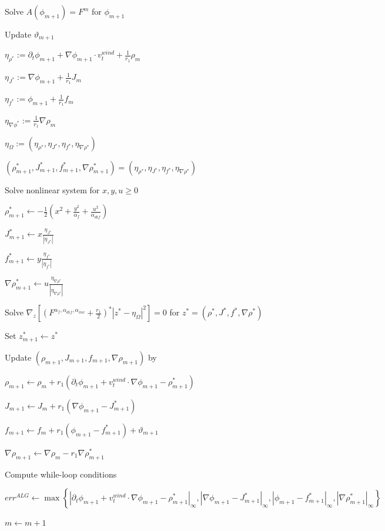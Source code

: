\begin{algorithm}
	\caption{Augmented Lagrangian Method with diffusion term}
	\begin{algorithmic}

		Solve $A(\phi_{m+1}) = F^m$ for $\phi_{m+1}$

		Update $\vartheta_{m+1}$

		$\eta_{\rho^*} := \partial_t\phi_{m+1} + \nabla\phi_{m+1} \cdot v_t^{wind} + \frac{1}{r_1}\rho_m$

		$\eta_{J^*} := \nabla\phi_{m+1} + \frac{1}{r_1}J_m$

		$\eta_{f^*} := \phi_{m+1} + \frac{1}{r_1}f_m$

		$\eta_{\nabla\phi^*} := \frac{1}{r_1}\nabla\rho_m$

		$\eta_\Omega := (\eta_{\rho^*},\eta_{J^*},\eta_{f^*},\eta_{\nabla\rho^*})$

			
		$(\rho_{m+1}^*,J_{m+1}^*,f_{m+1}^*,\nabla\rho_{m+1}^*) = (\eta_{\rho^*},\eta_{J^*},\eta_{f^*},\eta_{\nabla\rho^*})$
			 \Else

			 Solve nonlinear system for $x,y,u\geq 0$

			 $\rho_{m+1}^*\gets -\frac12\left(x^2+\frac{y^2}{\alpha_f}+\frac{u^2}{\alpha_{dif}}\right)$

			 $J_{m+1}^* \gets x\frac{\eta_{J^*}}{|\eta_{J^*}|}$

			 $f_{m+1}^* \gets y\frac{\eta_{f^*}}{|\eta_{f^*}|}$

			 $\nabla\rho_{m+1}^*\gets u \frac{\eta_{\nabla\rho^*}}{|\eta_{\nabla\rho^*}|}$
			 \EndIf
	\EndFor
	
	Solve $\nabla_z\left[(F^{\alpha_f,\alpha_{dif},\alpha_{inv}}+\frac{r_1}{2})^* |z^*-\eta_{\Omega}|^2\right] = 0$
		for $z^* = (\rho^*,J^*,f^*,\nabla\rho^*)$

		Set $z_{m+1}^*\gets z^*$
		\EndFor

		Update $(\rho_{m+1},J_{m+1},f_{m+1},\nabla\rho_{m+1})$ by

		$\rho_{m+1}\gets\rho_m+r_1\left(\partial_t\phi_{m+1}+v_t^{wind}\cdot\nabla\phi_{m+1}-\rho_{m+1}^*\right)$

		$J_{m+1}\gets J_m + r_1\left(\nabla\phi_{m+1}-J_{m+1}^*\right)$

		$f_{m+1}\gets f_m+r_1\left(\phi_{m+1}-f_{m+1}^*\right) + \vartheta_{m+1}$

		$\nabla\rho_{m+1}\gets\nabla\rho_m - r_1\nabla\rho_{m+1}^*$


		Compute while-loop conditions

		$err^{ALG}\gets \max\left\{\left|\partial_t\phi_{m+1}+v_t^{wind}\cdot\nabla\phi_{m+1}-\rho_{m+1}^*\right|_\infty, \left|\nabla\phi_{m+1} - J_{m+1}^*\right|_\infty, \left|\phi_{m+1} - f_{m+1}^*\right|_\infty, \left|\nabla\rho_{m+1}^*\right|_\infty\right\}$

		$m\gets m+1$
	\EndWhile
	\end{algorithmic}
\end{algorithm}
 \newpage

